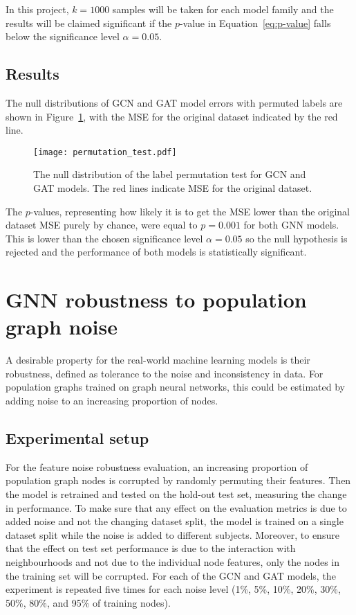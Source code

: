 In this project, $k=1000$ samples will be taken for each model family and the results will be claimed significant if the $p$-value in Equation~\eqref{eq:p-value} falls below the significance level $\alpha=0.05$. 

\subsection{Results}
The null distributions of GCN and GAT model errors with permuted labels are shown in Figure~\ref{figure:permutation-test}, with the MSE for the original dataset indicated by the red line.

\begin{figure}[h]
    \centering
    \texttt{[image: permutation\_test.pdf]}
    \caption{The null distribution of the label permutation test for GCN and GAT models. The red lines indicate MSE for the original dataset.}\label{figure:permutation-test}
\end{figure}

The $p$-values, representing how likely it is to get the MSE lower than the original dataset MSE purely by chance, were equal to $p=0.001$ for both GNN models. This is lower than the chosen significance level $\alpha=0.05$ so the null hypothesis is rejected and the performance of both models is statistically significant.


\section{GNN robustness to population graph noise}
\label{section:node-noise}
A desirable property for the real-world machine learning models is their robustness, defined as tolerance to the noise and inconsistency in data.
For population graphs trained on graph neural networks, this could be estimated by adding noise to an increasing proportion of nodes. 

\subsection{Experimental setup}
For the feature noise robustness evaluation, an increasing proportion of population graph nodes is corrupted by randomly permuting their features. Then the model is retrained and tested on the hold-out test set, measuring the change in performance. To make sure that any effect on the evaluation metrics is due to added noise and not the changing dataset split, the model is trained on a single dataset split while the noise is added to different subjects. Moreover, to ensure that the effect on test set performance is due to the interaction with neighbourhoods and not due to the individual node features, only the nodes in the training set will be corrupted. For each of the GCN and GAT models, the experiment is repeated five times for each noise level (1\%, 5\%, 10\%, 20\%, 30\%, 50\%, 80\%, and 95\% of training nodes).

